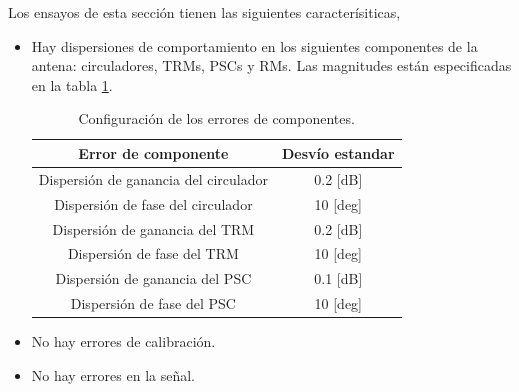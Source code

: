 Los ensayos de esta sección tienen las siguientes caracterísiticas,
\begin{itemize}
	\item Hay dispersiones de comportamiento en los siguientes componentes de la antena: circuladores, TRMs, PSCs y RMs. Las 
		magnitudes están especificadas en la tabla \ref{tab:errorReferences}.
		\begin{table}[H]
		  \footnotesize
		  \centering
		  \begin{tabular}{|c|c|}
			\hline
			\textbf{Error de componente} & \textbf{Desvío estandar} \tabularnewline \hline 
			Dispersión de ganancia del circulador &  0.2 [dB] \tabularnewline\hline 
			Dispersión de fase del circulador &  10 [deg] \tabularnewline\hline 
			Dispersión de ganancia del TRM &  0.2 [dB] \tabularnewline\hline 
			Dispersión de fase del TRM &  10 [deg] \tabularnewline\hline 
			Dispersión de ganancia del PSC &  0.1 [dB] \tabularnewline\hline 
			Dispersión de fase del PSC &  10 [deg] \tabularnewline\hline 
		  \end{tabular}
		  \caption{Configuración de los errores de componentes.}
		  \label{tab:errorReferences}
		\end{table}
	\item No hay errores de calibración.
	\item No hay errores en la señal.
\end{itemize}

